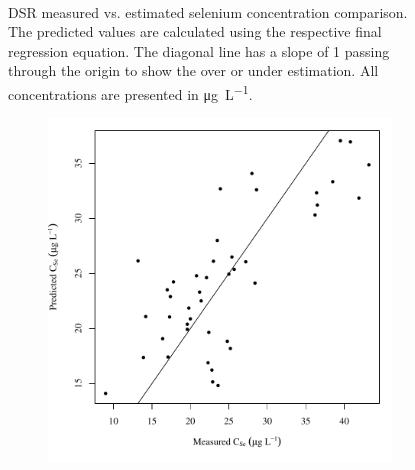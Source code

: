 \begin{linenumbers}
\begin{landscape}
\begin{figure}
\begin{subfigure}{0.7\textwidth}
		\end{subfigure}\\
		\caption[DSR measured vs. estimated selenium concentration comparison.]{DSR measured vs. estimated selenium concentration comparison.  The predicted values are calculated using the respective final regression equation.  The diagonal line has a slope of 1 passing through the origin to show the over or under estimation.  All concentrations are presented in \si{\micro\gram\per\liter}.}
		\label{fig:concPredVMeas_DS}
	\end{figure}
\end{landscape}

\subfiguremid
\begin{landscape}
	\begin{figure}
		\begin{subfigure}{0.7\textwidth}
			\centering
			\includegraphics[width=\tableCustomSize]{"Figures/Results_DSR/Stochastic/Conc Model pred v meas BIG"}
		\end{subfigure}%
		\begin{subfigure}{0.7\textwidth}
			\centering

\end{subfigure}
\end{figure}
\end{landscape}
\end{linenumbers}
